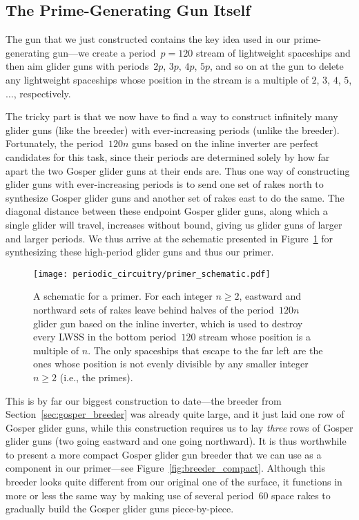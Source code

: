 \subsection{The Prime-Generating Gun Itself}\label{sec:primer_itself}

The gun that we just constructed contains the key idea used in our prime-generating gun---we create a period~$p = 120$ stream of lightweight spaceships and then aim glider guns with periods~$2p$, $3p$, $4p$, $5p$, and so on at the gun to delete any lightweight spaceships whose position in the stream is a multiple of $2$, $3$, $4$, $5$, $\ldots$, respectively.

The tricky part is that we now have to find a way to construct infinitely many glider guns (like the breeder) with ever-increasing periods (unlike the breeder). Fortunately, the period~$120n$ guns based on the inline inverter are perfect candidates for this task, since their periods are determined solely by how far apart the two Gosper glider guns at their ends are. Thus one way of constructing glider guns with ever-increasing periods is to send one set of rakes north to synthesize Gosper glider guns and another set of rakes east to do the same. The diagonal distance between these endpoint Gosper glider guns, along which a single glider will travel, increases without bound, giving us glider guns of larger and larger periods. We thus arrive at the schematic presented in Figure~\ref{fig:primer_schematic} for synthesizing these high-period glider guns and thus our primer.

\begin{figure}[!htb]
	\centering
	\texttt{[image: periodic\_circuitry/primer\_schematic.pdf]}
	\caption{A schematic for a primer. For each integer $n \geq 2$, eastward and northward sets of rakes leave behind halves of the period~$120n$ glider gun based on the inline inverter, which is used to destroy every LWSS in the bottom period~$120$ stream whose position is a multiple of $n$. The only spaceships that escape to the far left are the ones whose position is not evenly divisible by any smaller integer $n \geq 2$ (i.e., the primes).}
	\label{fig:primer_schematic}
\end{figure}

This is by far our biggest construction to date---the breeder from Section~\ref{sec:gosper_breeder} was already quite large, and it just laid one row of Gosper glider guns, while this construction requires us to lay \emph{three} rows of Gosper glider guns (two going eastward and one going northward). It is thus worthwhile to present a more compact Gosper glider gun breeder that we can use as a component in our primer---see Figure~\ref{fig:breeder_compact}. Although this breeder looks quite different from our original one of the surface, it functions in more or less the same way by making use of several period~$60$ space rakes to gradually build the Gosper glider guns piece-by-piece.

